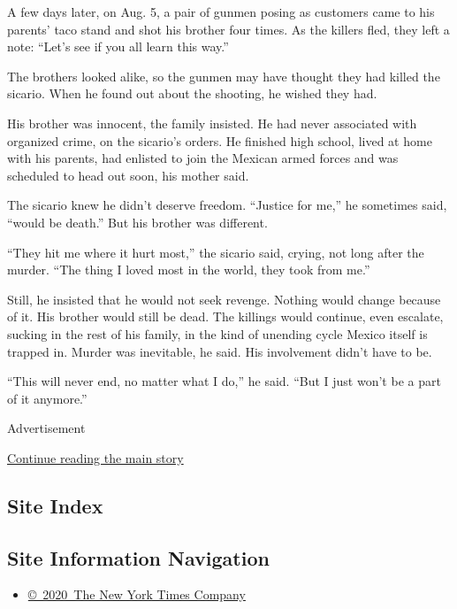 A few days later, on Aug. 5, a pair of gunmen posing as customers came
to his parents' taco stand and shot his brother four times. As the
killers fled, they left a note: ``Let's see if you all learn this way.''

The brothers looked alike, so the gunmen may have thought they had
killed the sicario. When he found out about the shooting, he wished they
had.

His brother was innocent, the family insisted. He had never associated
with organized crime, on the sicario's orders. He finished high school,
lived at home with his parents, had enlisted to join the Mexican armed
forces and was scheduled to head out soon, his mother said.

The sicario knew he didn't deserve freedom. ``Justice for me,'' he
sometimes said, ``would be death.'' But his brother was different.

``They hit me where it hurt most,'' the sicario said, crying, not long
after the murder. ``The thing I loved most in the world, they took from
me.''

Still, he insisted that he would not seek revenge. Nothing would change
because of it. His brother would still be dead. The killings would
continue, even escalate, sucking in the rest of his family, in the kind
of unending cycle Mexico itself is trapped in. Murder was inevitable, he
said. His involvement didn't have to be.

``This will never end, no matter what I do,'' he said. ``But I just
won't be a part of it anymore.''

Advertisement

\protect\hyperlink{after-bottom}{Continue reading the main story}

\hypertarget{site-index}{%
\subsection{Site Index}\label{site-index}}

\hypertarget{site-information-navigation}{%
\subsection{Site Information
Navigation}\label{site-information-navigation}}

\begin{itemize}
\tightlist
\item
  \href{https://help.nytimes3xbfgragh.onion/hc/en-us/articles/115014792127-Copyright-notice}{©~2020~The
  New York Times Company}
\end{itemize}

